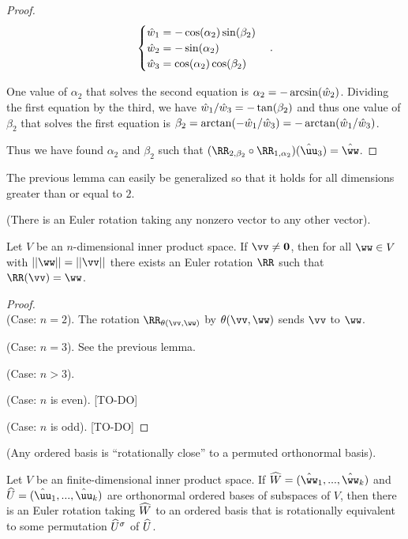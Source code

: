 \begin{proof}
    \begin{align*}
        \begin{cases}
            \hat{w}_1 = -\cos(\alpha_2) \sin(\beta_2) \\
            \hat{w}_2 = -\sin(\alpha_2) \\
            \hat{w}_3 = \cos(\alpha_2) \cos(\beta_2)
        \end{cases}.
    \end{align*}

    One value of $\alpha_2$ that solves the second equation is $\alpha_2 = -\arcsin(\hat{w}_2)$. Dividing the first equation by the third, we have $\hat{w}_1/\hat{w}_3 = -\tan(\beta_2)$ and thus one value of $\beta_2$ that solves the first equation is $\beta_2 = \arctan(-\hat{w}_1/\hat{w}_3) = -\arctan(\hat{w}_1/\hat{w}_3)$.

    Thus we have found $\alpha_2$ and $\beta_2$ such that $(\RR_{2, \beta_2} \circ \RR_{1, \alpha_2})(\huu_3) = \hww$.
\end{proof}

The previous lemma can easily be generalized so that it holds for all dimensions greater than or equal to $2$.

\begin{lemma}
    (There is an Euler rotation taking any nonzero vector to any other vector).
    
    Let $V$ be an $n$-dimensional inner product space. If $\vv \neq \mathbf{0}$, then for all $\ww \in V$ with $||\ww|| = ||\vv||$ there exists an Euler rotation $\RR$ such that $\RR(\vv) = \ww$.
\end{lemma}

\begin{proof}
    \mbox{} \\

    (Case: $n = 2$). The rotation $\RR_{\theta(\vv, \ww)}$ by $\theta(\vv, \ww)$ sends $\vv$ to $\ww$.
    
    (Case: $n = 3$). See the previous lemma.
    
    (Case: $n > 3$).
    
    \indent (Case: $n$ is even). [TO-DO]
    
    \indent (Case: $n$ is odd). [TO-DO]
\end{proof}

\begin{theorem}
\label{ch::exterior_pwrs::thm::n_rot_acts_on_orthonormal_basis}
     (Any ordered basis is ``rotationally close'' to a permuted orthonormal basis).
     
     Let $V$ be an finite-dimensional inner product space. If $\hW = (\hww_1, ..., \hww_k)$ and $\hU = (\huu_1, ..., \huu_k)$ are orthonormal ordered bases of subspaces of $V$, then there is an Euler rotation taking $\widehat{W}$ to an ordered basis that is rotationally equivalent to some permutation $\widehat{U}^\sigma$ of $\widehat{U}$. 
\end{theorem}

